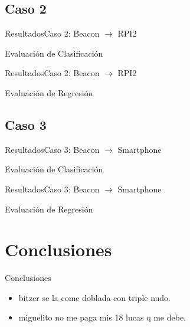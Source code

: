 \documentclass[10pt]{beamer}
\begin{document}
\subsection{Caso 2}
\begin{frame}{Resultados}{Caso 2: Beacon $\rightarrow$ RPI2}
\begin{block}{Evaluación de Clasificación}

\end{block}
\end{frame}
\begin{frame}{Resultados}{Caso 2: Beacon $\rightarrow$ RPI2}
\begin{block}{Evaluación de Regresión}

\end{block}
\end{frame}
\subsection{Caso 3}
\begin{frame}{Resultados}{Caso 3: Beacon $\rightarrow$ Smartphone}
\begin{block}{Evaluación de Clasificación}

\end{block}
\end{frame}
\begin{frame}{Resultados}{Caso 3: Beacon $\rightarrow$ Smartphone}
\begin{block}{Evaluación de Regresión}

\end{block}
\end{frame}
\section{Conclusiones}
\begin{frame}{Conclusiones}{}
\begin{itemize}
	\item bitzer se la come doblada con triple nudo.  
	\item miguelito no me paga mis 18 lucas q me debe.  
\end{itemize}
\end{frame}
{\aauwavesbg%
\begin{frame}%
\end{frame}}
\end{document}
